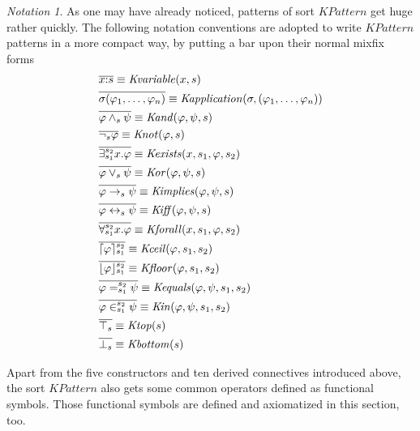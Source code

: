 \documentclass[UTF8,11pt]{article}
\newcounter{thmcounter}
\theoremstyle{plain}
\theoremstyle{definition}
\theoremstyle{remark}
\newtheorem{notation}   [thmcounter]{Notation}
\DeclarePairedDelimiter{\ceil}{\lceil}{\rceil}
\DeclarePairedDelimiter{\floor}{\lfloor}{\rfloor}
\newcommand{\cln}{{:}}
\newcommand{\KPattern}{\mathit{KPattern}}
\newcommand{\Kvariable}{\mathit{Kvariable}}
\newcommand{\Kand}{\mathit{Kand}}
\newcommand{\Kor}{\mathit{Kor}}
\newcommand{\Kimplies}{\mathit{Kimplies}}
\newcommand{\Kiff}{\mathit{Kiff}}
\newcommand{\Knot}{\mathit{Knot}}
\newcommand{\Kapplication}{\mathit{Kapplication}}
\newcommand{\Kexists}{\mathit{Kexists}}
\newcommand{\Kforall}{\mathit{Kforall}}
\newcommand{\Kequals}{\mathit{Kequals}}
\newcommand{\Kin}{\mathit{Kin}}
\newcommand{\Ktop}{\mathit{Ktop}}
\newcommand{\Kbottom}{\mathit{Kbottom}}
\newcommand{\Kfloor}{\mathit{Kfloor}}
\newcommand{\Kceil}{\mathit{Kceil}}
\begin{document}
\begin{notation}
	As one may have already noticed, patterns of sort $\KPattern$ get huge rather quickly.
	The following notation conventions are adopted to write $\KPattern$ patterns in a more compact way, by putting a bar upon their normal mixfix forms
	\begin{align*}
	  & \overline{x \cln s} \equiv \Kvariable(x, s)
	  \\
	  & \overline{\sigma(\varphi_1, \dots, \varphi_n)} \equiv \Kapplication(\sigma, (\varphi_1, \dots, \varphi_n))
	  \\
	  & \overline{\varphi \wedge_s \psi} \equiv \Kand(\varphi, \psi, s)
	  \\
	  & \overline{\neg_s \varphi} \equiv \Knot(\varphi, s)
	  \\
	  & \overline{\exists_{s_1}^{s_2} x . \varphi} \equiv \Kexists(x, s_1, \varphi, s_2)
	  \\
	  & \overline{\varphi \vee_s \psi} \equiv \Kor(\varphi, \psi, s)
	  \\
	  & \overline{\varphi \to_s \psi} \equiv \Kimplies(\varphi, \psi, s)
	  \\
	  & \overline{\varphi \leftrightarrow_s \psi} \equiv \Kiff(\varphi, \psi, s)
	  \\
	  & \overline{\forall_{s_1}^{s_2} x . \varphi} \equiv \Kforall(x, s_1, \varphi, s_2)
      \\
      & \overline{\ceil{\varphi}_{s_1}^{s_2}} \equiv \Kceil(\varphi, s_1, s_2)
      \\
      & \overline{\floor{\varphi}_{s_1}^{s_2}} \equiv \Kfloor(\varphi, s_1, s_2)
      \\
      & \overline{\varphi =_{s_1}^{s_2} \psi} \equiv \Kequals(\varphi, \psi, s_1, s_2)
      \\
      & \overline{\varphi \in_{s_1}^{s_2} \psi} \equiv \Kin(\varphi, \psi, s_1, s_2)
      \\
      & \overline{\top_s} \equiv \Ktop(s)
      \\
      & \overline{\bot_s} \equiv \Kbottom(s)
	\end{align*}
\end{notation}

Apart from the five constructors and ten derived connectives introduced above, the sort $\KPattern$ also gets some common operators defined as functional symbols.
Those functional symbols are defined and axiomatized in this section, too.
\end{document}
